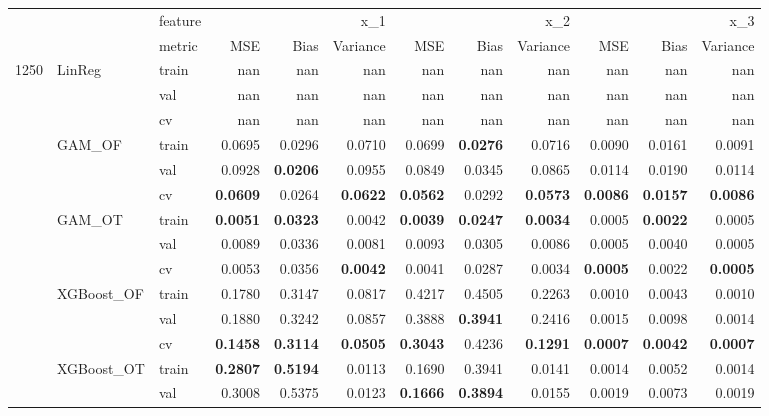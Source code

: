 \begin{tabular}{lllrrrrrrrrr}
 &  & feature & \multicolumn{3}{r}{x_1} & \multicolumn{3}{r}{x_2} & \multicolumn{3}{r}{x_3} \\
 &  & metric & MSE & Bias & Variance & MSE & Bias & Variance & MSE & Bias & Variance \\
\multirow[c]{15}{*}{1250} & \multirow[c]{3}{*}{LinReg} & train & nan & nan & nan & nan & nan & nan & nan & nan & nan \\
 &  & val & nan & nan & nan & nan & nan & nan & nan & nan & nan \\
 &  & cv & nan & nan & nan & nan & nan & nan & nan & nan & nan \\
 & \multirow[c]{3}{*}{GAM_OF} & train & 0.0695 & 0.0296 & 0.0710 & 0.0699 & \bfseries 0.0276 & 0.0716 & 0.0090 & 0.0161 & 0.0091 \\
 &  & val & 0.0928 & \bfseries 0.0206 & 0.0955 & 0.0849 & 0.0345 & 0.0865 & 0.0114 & 0.0190 & 0.0114 \\
 &  & cv & \bfseries 0.0609 & 0.0264 & \bfseries 0.0622 & \bfseries 0.0562 & 0.0292 & \bfseries 0.0573 & \bfseries 0.0086 & \bfseries 0.0157 & \bfseries 0.0086 \\
 & \multirow[c]{3}{*}{GAM_OT} & train & \bfseries 0.0051 & \bfseries 0.0323 & 0.0042 & \bfseries 0.0039 & \bfseries 0.0247 & \bfseries 0.0034 & 0.0005 & \bfseries 0.0022 & 0.0005 \\
 &  & val & 0.0089 & 0.0336 & 0.0081 & 0.0093 & 0.0305 & 0.0086 & 0.0005 & 0.0040 & 0.0005 \\
 &  & cv & 0.0053 & 0.0356 & \bfseries 0.0042 & 0.0041 & 0.0287 & 0.0034 & \bfseries 0.0005 & 0.0022 & \bfseries 0.0005 \\
 & \multirow[c]{3}{*}{XGBoost_OF} & train & 0.1780 & 0.3147 & 0.0817 & 0.4217 & 0.4505 & 0.2263 & 0.0010 & 0.0043 & 0.0010 \\
 &  & val & 0.1880 & 0.3242 & 0.0857 & 0.3888 & \bfseries 0.3941 & 0.2416 & 0.0015 & 0.0098 & 0.0014 \\
 &  & cv & \bfseries 0.1458 & \bfseries 0.3114 & \bfseries 0.0505 & \bfseries 0.3043 & 0.4236 & \bfseries 0.1291 & \bfseries 0.0007 & \bfseries 0.0042 & \bfseries 0.0007 \\
 & \multirow[c]{3}{*}{XGBoost_OT} & train & \bfseries 0.2807 & \bfseries 0.5194 & 0.0113 & 0.1690 & 0.3941 & 0.0141 & 0.0014 & 0.0052 & 0.0014 \\
 &  & val & 0.3008 & 0.5375 & 0.0123 & \bfseries 0.1666 & \bfseries 0.3894 & 0.0155 & 0.0019 & 0.0073 & 0.0019 \\

\end{tabular}
